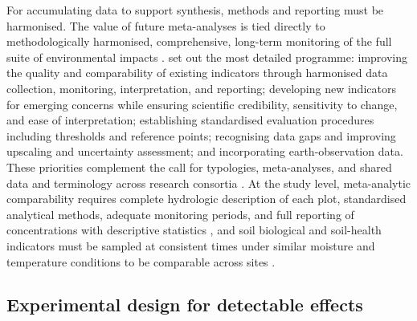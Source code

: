 For accumulating data to support synthesis, methods and reporting must be
harmonised. The value of future meta-analyses is tied directly to
methodologically harmonised, comprehensive, long-term monitoring of the full
suite of environmental impacts \parencite{Wu2025}. \textcite{Zhang2018} set
out the most detailed programme: improving the quality and comparability of
existing indicators through harmonised data collection, monitoring,
interpretation, and reporting; developing new indicators for emerging
concerns while ensuring scientific credibility, sensitivity to change, and
ease of interpretation; establishing standardised evaluation procedures
including thresholds and reference points; recognising data gaps and
improving upscaling and uncertainty assessment; and incorporating
earth-observation data. These priorities complement the call for typologies,
meta-analyses, and shared data and terminology across research consortia
\parencite{Rogger2017}. At the study level, meta-analytic comparability
requires complete hydrologic description of each plot, standardised
analytical methods, adequate monitoring periods, and full reporting of
concentrations with descriptive statistics \parencite{Ghirardini2019}, and
soil biological and soil-health indicators must be sampled at consistent
times under similar moisture and temperature conditions to be comparable
across sites \parencite{Sherbine2023,Li2023b}.

\subsection{Experimental design for detectable effects}

